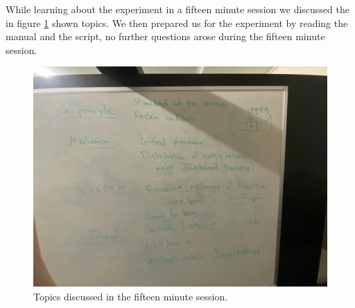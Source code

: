 \documentclass[../../main.tex]{subfiles}
\begin{document}
    While learning about the experiment in a fifteen minute session we discussed the in figure \ref{fig:DiscussionGTKN} shown topics. We then prepared us for the experiment by reading the manual and the script, no further questions arose during the fifteen minute session.
    \begin{figure}[H]
        \centering
        \includegraphics[width=0.8\linewidth]{Sektionen/3-HeNe-Laser/Bilddateien/get-to-know-topics.jpg}
        \caption{Topics discussed in the fifteen minute session.}
        \label{fig:DiscussionGTKN}
    \end{figure}
    
\end{document}
